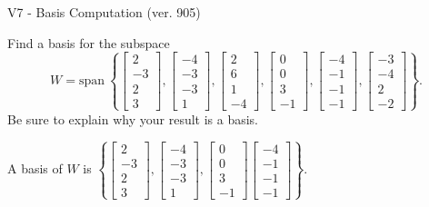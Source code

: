 \begin{exercise}
  \begin{exerciseTitle}V7 - Basis Computation (ver. 905)\end{exerciseTitle}
  \begin{exerciseStatement}
    Find a basis for the subspace 
\[W=\mathrm{span}\ \left\{\left[\begin{array}{r}
2 \\
-3 \\
2 \\
3
\end{array}\right] , \left[\begin{array}{r}
-4 \\
-3 \\
-3 \\
1
\end{array}\right] , \left[\begin{array}{r}
2 \\
6 \\
1 \\
-4
\end{array}\right] , \left[\begin{array}{r}
0 \\
0 \\
3 \\
-1
\end{array}\right] , \left[\begin{array}{r}
-4 \\
-1 \\
-1 \\
-1
\end{array}\right] , \left[\begin{array}{r}
-3 \\
-4 \\
2 \\
-2
\end{array}\right]\right\}.\]
 Be sure to explain why your result is a basis.


  \end{exerciseStatement}
  \begin{exerciseAnswer}
   A basis of \(W\) is  \(\left\{\left[\begin{array}{r}
2 \\
-3 \\
2 \\
3
\end{array}\right] , \left[\begin{array}{r}
-4 \\
-3 \\
-3 \\
1
\end{array}\right] , \left[\begin{array}{r}
0 \\
0 \\
3 \\
-1
\end{array}\right] \left[\begin{array}{r}
-4 \\
-1 \\
-1 \\
-1
\end{array}\right]\right\}\).
  


  \end{exerciseAnswer}
\end{exercise}